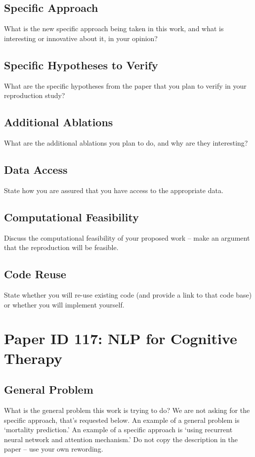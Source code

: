 \documentclass[11pt,a4paper]{article}
\begin{document}
\subsection{Specific Approach}
What is the new specific approach being taken in this work, and what is interesting or innovative about it, in your opinion?

\subsection{Specific Hypotheses to Verify}
What are the specific hypotheses from the paper that you plan to verify in your reproduction study?

\subsection{Additional Ablations}
What are the additional ablations you plan to do, and why are they interesting?

\subsection{Data Access}
State how you are assured that you have access to the appropriate data.

\subsection{Computational Feasibility}
Discuss the computational feasibility of your proposed work – make an argument that the reproduction will be feasible.

\subsection{Code Reuse}
State whether you will re-use existing code (and provide a link to that code base) or whether you will implement yourself.

\section{Paper ID 117: NLP for Cognitive Therapy}
\subsection{General Problem}
\cite{burger_2021}
What is the general problem this work is trying to do? We are not asking for the specific approach, that’s requested below. An example of a general problem is ‘mortality prediction.’ An example of a specific approach is ‘using recurrent neural network and attention mechanism.’ Do not copy the description in the paper – use your own rewording.
\end{document}
